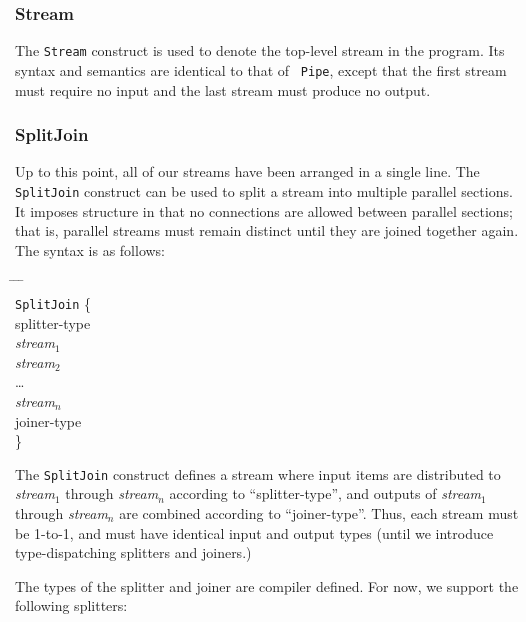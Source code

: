 \documentclass[draft]{article}
\begin{document}
\subsubsection{Stream}

The {\tt Stream} construct is used to denote the top-level stream in
the program.  Its syntax and semantics are identical to that of {\tt
Pipe}, except that the first stream must require no input and the last
stream must produce no output.

\subsubsection{SplitJoin}

Up to this point, all of our streams have been arranged in a single
line.  The {\tt SplitJoin} construct can be used to split a stream
into multiple parallel sections.  It imposes structure in that no
connections are allowed between parallel sections; that is, parallel
streams must remain distinct until they are joined together again.
The syntax is as follows:

\begin{tabbing}
\hspace{0.2in} \= \hspace{0.2in} \= \hspace{0.2in} \= \hspace{0.2in} \= \\
{\tt SplitJoin} \{ \\
\> splitter-type \\
\> {\it stream$_1$} \\
\> {\it stream$_2$} \\
\> \dots \\
\> {\it stream$_n$} \\
\> joiner-type \\
\}
\end{tabbing}

The {\tt SplitJoin} construct defines a stream where input items are
distributed to {\it stream$_1$} through {\it stream$_n$} according to
``splitter-type'', and outputs of {\it stream$_1$} through {\it
stream$_n$} are combined according to ``joiner-type''.  Thus, each
stream must be 1-to-1, and must have identical input and output types
(until we introduce type-dispatching splitters and joiners.)

The types of the splitter and joiner are compiler defined.  For now,
we support the following splitters:
\end{document}
